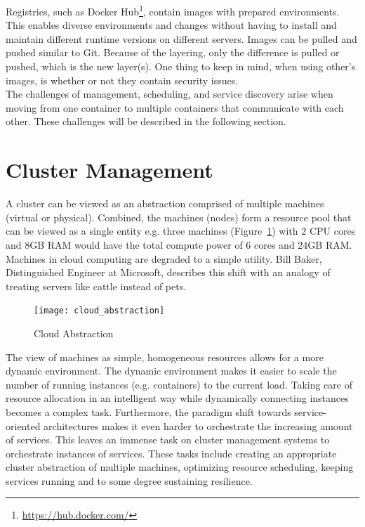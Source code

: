\noindent
Registries, such as Docker Hub\footnote{\url{https://hub.docker.com/}}, contain images with prepared environments. This enables diverse environments and changes without having to install and maintain different runtime versions on different servers. Images can be pulled and pushed similar to Git. Because of the layering, only the difference is pulled or pushed, which is the new layer(s). One thing to keep in mind, when using other's images, is whether or not they contain security issues. \\

\noindent
The challenges of management, scheduling, and service discovery arise when moving from one container to multiple containers that communicate with each other. These challenges will be described in the following section.

\section{Cluster Management}\label{sec:cluster_management}
A cluster can be viewed as an abstraction comprised of multiple machines (virtual or physical). Combined, the machines (nodes) form a resource pool that can be viewed as a single entity e.g. three machines (Figure~\ref{fig:cloud_abstraction}) with 2 CPU cores and 8GB RAM would have the total compute power of 6 cores and 24GB RAM. Machines in cloud computing are degraded to a simple utility. Bill Baker, Distinguished Engineer at Microsoft, describes this shift with an analogy of treating servers like cattle instead of pets. 

\begin{figure}[H]
    \centering
    \texttt{[image: cloud\_abstraction]}
    \caption{Cloud Abstraction}
    \label{fig:cloud_abstraction}
\end{figure}

\noindent
The view of machines as simple, homogeneous resources allows for a more dynamic environment. The dynamic environment makes it easier to scale the number of running instances (e.g. containers) to the current load. Taking care of resource allocation in an intelligent way while dynamically connecting instances becomes a complex task. Furthermore, the paradigm shift towards service-oriented architectures makes it even harder to orchestrate the increasing amount of services. This leaves an immense task on cluster management systems to orchestrate instances of services. These tasks include creating an appropriate cluster abstraction of multiple machines, optimizing resource scheduling, keeping services running and to some degree sustaining resilience. \\

